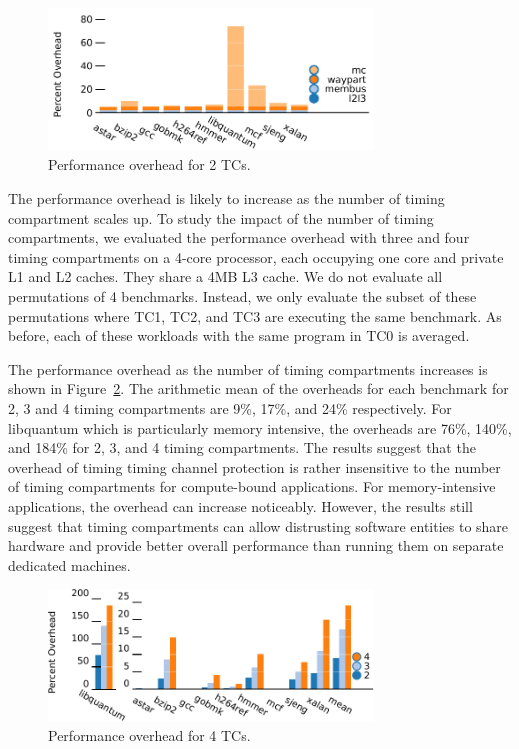 \begin{figure}
    \begin{center}
        \includegraphics[width=3.4in]{figs/breakdown.pdf}
        \caption{Performance overhead for 2 TCs.}
        \label{fig:performance}
    \end{center}
\end{figure}

The performance overhead is likely to increase as the number of timing 
compartment scales up. To study the impact of the number of timing 
compartments, we evaluated the performance overhead with three and four timing 
compartments on a 4-core  processor, each occupying one core and private L1 and 
L2 caches. They share a 4MB L3 cache. We do not evaluate all permutations of 4 
benchmarks. Instead, we only evaluate the subset of these permutations where 
TC1, TC2, and TC3 are executing the same benchmark. As before, each of these 
workloads with the same program in TC0 is averaged.

The performance overhead as the number of timing compartments increases is 
shown in Figure~\ref{fig:scalability}. The arithmetic mean of the overheads for 
each benchmark for 2, 3 and 4 timing compartments are 9\%, 17\%, and 24\% 
respectively. For libquantum which is particularly memory intensive, the 
overheads are 76\%, 140\%, and 184\% for 2, 3, and 4 timing compartments. The 
results suggest that the overhead of timing timing channel protection is rather 
insensitive to the number of timing compartments for compute-bound 
applications. For memory-intensive applications, the overhead can increase 
noticeably. However, the results still suggest that timing compartments can 
allow distrusting software entities to share hardware and provide better 
overall performance than running them on separate dedicated machines.

\begin{figure}
    \begin{center}
        \includegraphics[width=3.4in]{figs/scalability_split.pdf}
        \caption{Performance overhead for 4 TCs.}
        \label{fig:scalability}
    \end{center}
\end{figure}

